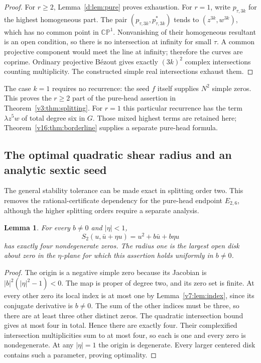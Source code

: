 \documentclass[UTF8,11pt]{ctexart}
\newtheorem{lem}[thm]{Lemma}
\theoremstyle{definition}
\numberwithin{equation}{section}
\newcommand{\CP}{\mathbb {CP}}\newcommand{\cP}{\mathcal P}
\begin{document}
\begin{proof}
For $r\ge2$, Lemma~\ref{d:lem:pure} proves exhaustion.
For $r=1$, write $p_{\tau,3k}$ for the highest homogeneous part.
The pair $(p_{\tau,3k},p_{\tau,3k}^*)$ tends to
$(z^{3k},w^{3k})$, which has no common point in $\CP^1$.
Nonvanishing of their homogeneous resultant is an open condition,
so there is no intersection at infinity for small $\tau$.
A common projective component would meet the line at infinity;
therefore the curves are coprime. Ordinary projective B\'ezout gives
exactly $(3k)^2$ complex intersections counting multiplicity.
The constructed simple real intersections exhaust them.
\end{proof}

The case $k=1$ requires no recurrence: the seed $f$ itself supplies
$N^2$ simple zeros. This proves the $r\ge2$ part of the pure-head assertion in
Theorem~\ref{v3:thm:splitting}. For $r=1$ this particular recurrence
has the term $\lambda z^5w$ of total degree six in $G$.
Those mixed highest terms are retained here;
Theorem~\ref{v16:thm:borderline} supplies a separate pure-head formula.

\subsection{The optimal quadratic shear radius and an analytic sextic seed}
\label{v15:sec:quadraticshear}

The general stability tolerance can be made exact in splitting order
two. This removes the rational-certificate dependency for the pure-head
endpoint $E_{2,6}$, although the higher splitting orders require a
separate analysis.

\begin{lem}\label{v15:lem:unitdisk}
For every $b\ne0$ and $|\eta|<1$,
\[
 S_2(u,\bar u+\eta u)=u^2+b\bar u+b\eta u
\]
has exactly four nondegenerate zeros. The radius one is the largest
open disk about zero in the $\eta$-plane for which this assertion
holds uniformly in $b\ne0$.
\end{lem}
\begin{proof}
The origin is a negative simple zero because its Jacobian is
$|b|^2(|\eta|^2-1)<0$. The map is proper of degree two, and its
zero set is finite. At every other zero its local index is at most
one by Lemma~\ref{v7:lem:index}, since its conjugate derivative is
$b\ne0$. The sum of the other indices must be three, so there are
at least three other distinct zeros. The quadratic intersection
bound gives at most four in total. Hence there are exactly four.
Their complexified intersection multiplicities sum to at most four,
so each is one and every zero is nondegenerate. At any $|\eta|=1$
the origin is degenerate. Every larger centered disk contains such
a parameter, proving optimality.
\end{proof}
\end{document}
